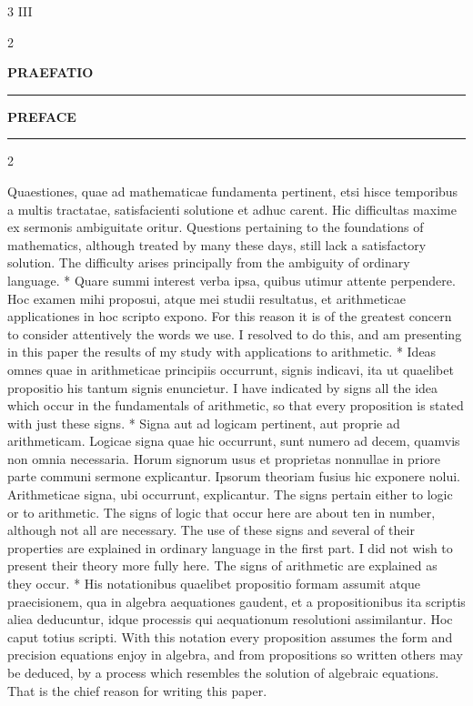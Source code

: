 \documentclass{book}
\newcommand{\s}{\switchcolumn} %
\newcommand\peanoHeadingLarge[1]{ \vspace{2cm} {\Large \textbf{\uppercase{#1}} \nopagebreak[4]}

  \noindent\rule{2cm}{0.4pt} \nopagebreak[1]}
\newcommand{\peanoPage}[1]{\vspace{1ex}

  \columnratio{0.475, 0.05, 0.475} \begin{paracol}{3} \centering \hdashrule{\columnwidth}{0.1mm}{0.1mm 1mm} \s #1 \s \hdashrule{\columnwidth}{0.1mm}{0.1mm 1mm} \end{paracol}

\vspace{1ex}}
\newenvironment{translateTwoCol}
               { %
                 \columnratio{0.5, 0.5} \begin{paracol}{2}
                 \newcommand{\LAT}{\switchcolumn[0]*}
                 \newcommand{\ENG}{\switchcolumn[1]}
               }
               { %
                 \let\ENG\undefined
                 \let\LAT\undefined
                 \end{paracol}
               }
\begin{document}
\vspace{1em}
\peanoPage{III} %

\begin{translateTwoCol}
\centering
{}
{}
\peanoHeadingLarge{Praefatio}
\ENG
\peanoHeadingLarge{Preface}
\end{translateTwoCol}

\begin{translateTwoCol}
Quaestiones, quae ad mathematicae fundamenta pertinent, etsi hisce temporibus a multis tractatae, satisfacienti solutione et adhuc carent. Hic difficultas maxime ex sermonis ambiguitate oritur.
\ENG Questions pertaining to the foundations of mathematics, although treated by many these days, still lack a satisfactory solution. The difficulty arises principally from the ambiguity of ordinary language.
\LAT
Quare summi interest verba ipsa, quibus utimur attente perpendere. Hoc examen mihi proposui, atque mei studii resultatus, et arithmeticae applicationes in hoc scripto expono.
\ENG For this reason it is of the greatest concern to consider attentively the words we use. I resolved to do this, and am presenting in this paper the results of my study with applications to arithmetic.
\LAT
Ideas omnes quae in arithmeticae principiis occurrunt, signis indicavi, ita ut quaelibet propositio his tantum signis enuncietur.
\ENG I have indicated by signs all the idea which occur in the fundamentals of arithmetic, so that every proposition is stated with just these signs.
\LAT
Signa aut ad logicam pertinent, aut proprie ad arithmeticam. Logicae signa quae hic occurrunt, sunt numero ad decem, quamvis non omnia necessaria. Horum signorum usus et proprietas nonnullae in priore parte communi sermone explicantur. Ipsorum theoriam fusius hic exponere nolui. Arithmeticae signa, ubi occurrunt, explicantur.
\ENG The signs pertain either to logic or to arithmetic. The signs of logic that occur here are about ten in number, although not all are necessary. The use of these signs and several of their properties are explained in ordinary language in the first part. I did not wish to present their theory more fully here. The signs of arithmetic are explained as they occur.
\LAT
His notationibus quaelibet propositio formam assumit atque praecisionem, qua in algebra aequationes gaudent, et a propositionibus ita scriptis aliea deducuntur, idque processis qui aequationum resolutioni assimilantur. Hoc caput totius scripti.
\ENG With this notation every proposition assumes the form and precision equations enjoy in algebra, and from propositions so written others may be deduced, by a process which resembles the solution of algebraic equations. That is the chief reason for writing this paper.

\end{translateTwoCol}
\end{document}
